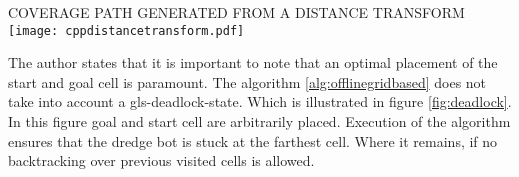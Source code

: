 \begin{RoyalFigure}[!htb, label=fig:ccpdistancetransform]{COVERAGE PATH GENERATED FROM A DISTANCE TRANSFORM~\citet{wong_qualitative_2006}}
	\texttt{[image: cppdistancetransform.pdf]}
\end{RoyalFigure}

The author states that it is important to note that an optimal placement of the start and goal cell is paramount. The algorithm \ref{alg:offlinegridbased} does not take into account a \gls{gls-deadlock-state}. Which is illustrated in figure \ref{fig:deadlock}. In this figure goal and start cell are arbitrarily placed. Execution of the algorithm ensures that the dredge bot is stuck at the farthest cell. Where it remains, if no backtracking over previous visited cells is allowed.

